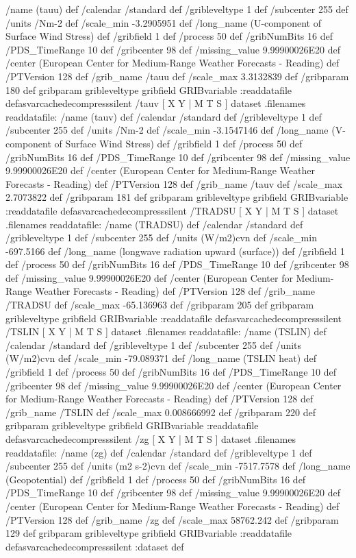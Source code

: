 \begin{ingrid}
{{/name (tauu) def
 /calendar /standard def
 /gribleveltype 1 def
 /subcenter 255 def
 /units /Nm-2 def
 /scale_min -3.2905951 def
 /long_name (U-component of Surface Wind Stress) def
 /gribfield 1 def
 /process 50 def
 /gribNumBits 16 def
 /PDS_TimeRange 10 def
 /gribcenter 98 def
 /missing_value 9.99900026E20 def
 /center (European Center for Medium-Range Weather Forecasts - Reading) def
 /PTVersion 128 def
 /grib_name /tauu def
 /scale_max 3.3132839 def
 /gribparam 180 def
 gribparam gribleveltype gribfield GRIBvariable
 :readdatafile
}defasvarcachedecompresssilent
 /tauv{
[ X Y | M T S ] dataset .filenames readdatafile:
/name (tauv) def
 /calendar /standard def
 /gribleveltype 1 def
 /subcenter 255 def
 /units /Nm-2 def
 /scale_min -3.1547146 def
 /long_name (V-component of Surface Wind Stress) def
 /gribfield 1 def
 /process 50 def
 /gribNumBits 16 def
 /PDS_TimeRange 10 def
 /gribcenter 98 def
 /missing_value 9.99900026E20 def
 /center (European Center for Medium-Range Weather Forecasts - Reading) def
 /PTVersion 128 def
 /grib_name /tauv def
 /scale_max 2.7073822 def
 /gribparam 181 def
 gribparam gribleveltype gribfield GRIBvariable
 :readdatafile
}defasvarcachedecompresssilent
 /TRADSU{
[ X Y | M T S ] dataset .filenames readdatafile:
/name (TRADSU) def
 /calendar /standard def
 /gribleveltype 1 def
 /subcenter 255 def
 /units (W/m2)cvn def
 /scale_min -697.5166 def
 /long_name (longwave radiation upward (surface)) def
 /gribfield 1 def
 /process 50 def
 /gribNumBits 16 def
 /PDS_TimeRange 10 def
 /gribcenter 98 def
 /missing_value 9.99900026E20 def
 /center (European Center for Medium-Range Weather Forecasts - Reading) def
 /PTVersion 128 def
 /grib_name /TRADSU def
 /scale_max -65.136963 def
 /gribparam 205 def
 gribparam gribleveltype gribfield GRIBvariable
 :readdatafile
}defasvarcachedecompresssilent
 /TSLIN{
[ X Y | M T S ] dataset .filenames readdatafile:
/name (TSLIN) def
 /calendar /standard def
 /gribleveltype 1 def
 /subcenter 255 def
 /units (W/m2)cvn def
 /scale_min -79.089371 def
 /long_name (TSLIN heat) def
 /gribfield 1 def
 /process 50 def
 /gribNumBits 16 def
 /PDS_TimeRange 10 def
 /gribcenter 98 def
 /missing_value 9.99900026E20 def
 /center (European Center for Medium-Range Weather Forecasts - Reading) def
 /PTVersion 128 def
 /grib_name /TSLIN def
 /scale_max 0.008666992 def
 /gribparam 220 def
 gribparam gribleveltype gribfield GRIBvariable
 :readdatafile
}defasvarcachedecompresssilent
 /zg{
[ X Y | M T S ] dataset .filenames readdatafile:
/name (zg) def
 /calendar /standard def
 /gribleveltype 1 def
 /subcenter 255 def
 /units (m2 s-2)cvn def
 /scale_min -7517.7578 def
 /long_name (Geopotential) def
 /gribfield 1 def
 /process 50 def
 /gribNumBits 16 def
 /PDS_TimeRange 10 def
 /gribcenter 98 def
 /missing_value 9.99900026E20 def
 /center (European Center for Medium-Range Weather Forecasts - Reading) def
 /PTVersion 128 def
 /grib_name /zg def
 /scale_max 58762.242 def
 /gribparam 129 def
 gribparam gribleveltype gribfield GRIBvariable
 :readdatafile
}defasvarcachedecompresssilent
:dataset
} def
\end{ingrid}
